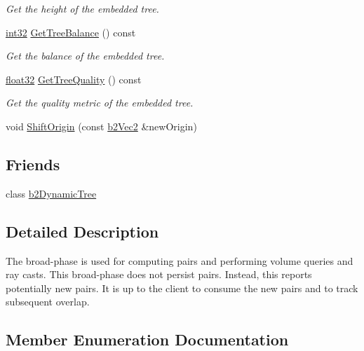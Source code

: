 \begin{DoxyCompactItemize}
\begin{DoxyCompactList}\small\item\em Get the height of the embedded tree. \end{DoxyCompactList}\item 
\mbox{\hyperlink{b2_settings_8h_a43d43196463bde49cb067f5c20ab8481}{int32}} \mbox{\hyperlink{classb2_broad_phase_a29612faf9f0191827440178629d5e887}{Get\+Tree\+Balance}} () const
\begin{DoxyCompactList}\small\item\em Get the balance of the embedded tree. \end{DoxyCompactList}\item 
\mbox{\hyperlink{b2_settings_8h_aacdc525d6f7bddb3ae95d5c311bd06a1}{float32}} \mbox{\hyperlink{classb2_broad_phase_a4e7d2f5d16ac100b18511e6a42e758bf}{Get\+Tree\+Quality}} () const
\begin{DoxyCompactList}\small\item\em Get the quality metric of the embedded tree. \end{DoxyCompactList}\item 
void \mbox{\hyperlink{classb2_broad_phase_a410e6115e3d1b4fca61cfbf397767772}{Shift\+Origin}} (const \mbox{\hyperlink{structb2_vec2}{b2\+Vec2}} \&new\+Origin)
\end{DoxyCompactItemize}
\subsection*{Friends}
\begin{DoxyCompactItemize}
\item 
class \mbox{\hyperlink{classb2_broad_phase_afc450dc71ee33ab0c9e7f1c31d6f7f60}{b2\+Dynamic\+Tree}}
\end{DoxyCompactItemize}


\subsection{Detailed Description}
The broad-\/phase is used for computing pairs and performing volume queries and ray casts. This broad-\/phase does not persist pairs. Instead, this reports potentially new pairs. It is up to the client to consume the new pairs and to track subsequent overlap. 

\subsection{Member Enumeration Documentation}
\mbox{\label{classb2_broad_phase_ad14dca932793724b27024e60a6ade466}} 
